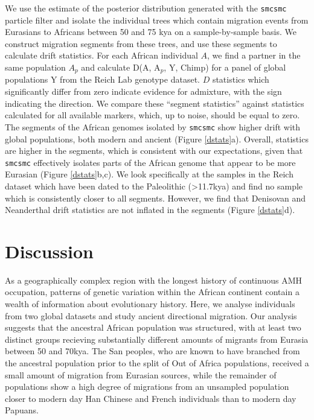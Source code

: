 \documentclass{article}
\begin{document}
We use the estimate of the posterior distribution generated with the {\tt smcsmc} particle filter and isolate the individual trees which contain migration events from Eurasians to Africans between 50 and 75 kya on a sample-by-sample basis. We construct migration segments from these trees, and use these segments to calculate drift statistics. For each African individual $A$, we find a partner in the same population $A_p$ and calculate D(A, A$_p$, Y, Chimp) for a panel of global populations Y from the Reich Lab genotype dataset. $D$ statistics which significantly differ from zero indicate evidence for admixture, with the sign indicating the direction. We compare these ``segment statistics'' against statistics calculated for all available markers, which, up to noise, should be equal to zero. The segments of the African genomes isolated by {\tt smcsmc} show higher drift with global populations, both modern and ancient (Figure \ref{dstats}a). Overall, statistics are higher in the segments, which is consistent with our expectations, given that {\tt smcsmc} effectively isolates parts of the African genome that appear to be more Eurasian (Figure \ref{dstats}b,c). We look specifically at the samples in the Reich dataset which have been dated to the Paleolithic (>11.7kya) and find no sample which is consistently closer to all segments. However, we find that Denisovan and Neanderthal drift statistics are not inflated in the segments (Figure \ref{dstats}d). 


\section{Discussion}

As a geographically complex region with the longest history of continuous AMH occupation, patterns of genetic variation within the African continent contain a wealth of information about evolutionary history. Here, we analyse individuals from two global datasets and study ancient directional migration. Our analysis suggests that the ancestral African population was structured, with at least two distinct groups recieving substantially different amounts of migrants from Eurasia between 50 and 70kya. The San peoples, who are known to have branched from the ancestral population prior to the split of Out of Africa populations, received a small amount of migration from Eurasian sources, while the remainder of populations show a high degree of migrations from an unsampled population closer to modern day Han Chinese and French individuals than to modern day Papuans. 
\end{document}
